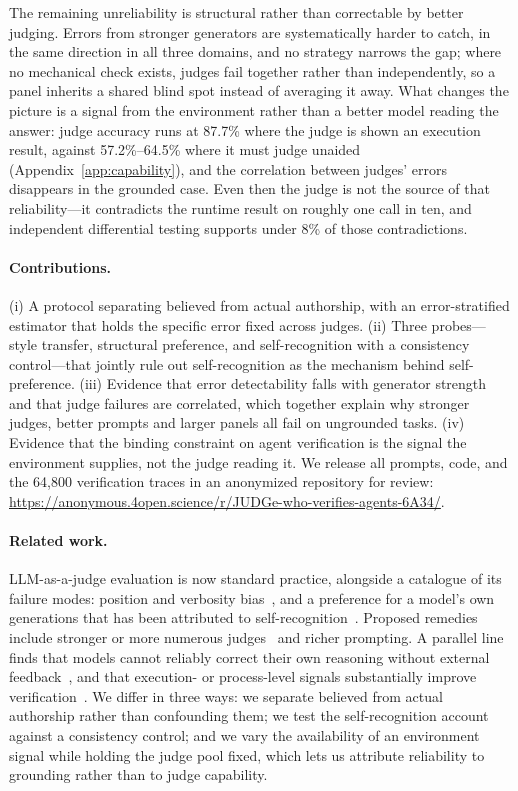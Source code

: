 \documentclass{article}
\begin{document}
The remaining unreliability is structural rather than correctable by better judging.
Errors from stronger generators are systematically harder to catch, in the same direction
in all three domains, and no strategy narrows the gap; where no mechanical check exists,
judges fail together rather than independently, so a panel inherits a shared blind spot
instead of averaging it away. What changes the picture is a signal from the environment
rather than a better model reading the answer: judge accuracy runs at 87.7\% where the
judge is shown an execution result, against 57.2\%--64.5\% where it must judge unaided
(Appendix~\ref{app:capability}), and
the correlation between judges' errors disappears in the grounded case. Even then the
judge is not the source of that reliability---it contradicts the runtime result on
roughly one call in ten, and independent differential testing supports under 8\% of
those contradictions.

\paragraph{Contributions.}
(i) A protocol separating believed from actual authorship, with an error-stratified
estimator that holds the specific error fixed across judges. (ii) Three probes---style
transfer, structural preference, and self-recognition with a consistency control---that
jointly rule out self-recognition as the mechanism behind self-preference. (iii) Evidence
that error detectability falls with generator strength and that judge failures are
correlated, which together explain why stronger judges, better prompts and larger panels
all fail on ungrounded tasks. (iv) Evidence that the binding constraint on agent verification is the signal the environment supplies, not the judge reading it. We release all prompts, code, and the 64{,}800 verification traces in an anonymized repository for review: \url{https://anonymous.4open.science/r/JUDGe-who-verifies-agents-6A34/}.
\paragraph{Related work.}
LLM-as-a-judge evaluation is now standard practice, alongside a catalogue of its failure
modes: position and verbosity bias~\citep{zheng2023judging,wang2023fair}, and a preference
for a model's own generations that has been attributed to
self-recognition~\citep{panickssery2024llm}. Proposed remedies include stronger or more
numerous judges~\citep{verga2024replacing} and richer prompting. A parallel line finds that
models cannot reliably correct their own reasoning without external
feedback~\citep{huang2024selfcorrect}, and that execution- or process-level signals
substantially improve verification~\citep{liu2023evalplus,lightman2024verify}. We differ in
three ways: we separate believed from actual authorship rather than confounding them; we
test the self-recognition account against a consistency control; and we vary the
availability of an environment signal while holding the judge pool fixed, which lets us
attribute reliability to grounding rather than to judge capability.
\end{document}
